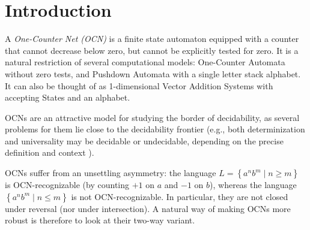 \documentclass[11pt,a4paper]{amsart}
\theoremstyle{definition}
\begin{document}
	\section{Introduction}
	A \emph{One-Counter Net (OCN)} is a finite state automaton equipped with a
	counter that cannot decrease below zero, but cannot be explicitly tested for
	zero.  It is a natural restriction of several computational models: One-Counter
	Automata without zero tests, and Pushdown
	Automata with a single letter stack alphabet. It can also be thought of as
	1-dimensional Vector Addition Systems with accepting States and an alphabet.
	
	OCNs are an attractive model for studying the border of decidability, as several
	problems for them lie close to the decidability frontier (e.g., both
	determinization and universality may be decidable or undecidable, depending on
	the precise definition and context
	\cite{hofman2013decidability,hofman2014trace,almagor2020parametrized,almagor2022determinization,almagor2024dimension}).
	
	OCNs suffer from an unsettling asymmetry: the language
	$L=\left\{a^nb^m \mid n \geq m\right\}$ is OCN-recognizable (by counting $+1$ on
	$a$ and $-1$ on $b$), whereas the language $\left\{a^nb^m \mid n \leq m\right\}$ is
	not OCN-recognizable. In particular, they are not closed under reversal (nor
	under intersection).  A natural way of making OCNs more robust is therefore to
	look at their two-way variant. 
	
\end{document}
